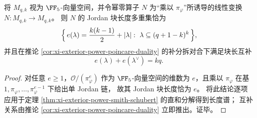 \begin{corollary}\label{cor:xi-exterior-power-jordan-schubert}
将 \(M_{q,k}\) 视为 \(\FF_5\)-向量空间，并令幂零算子 \(N\) 为“乘以 \(\pi_\varphi\)”所诱导的线性变换
\(
N:M_{q,k}\to M_{q,k}
\)。
则 \(N\) 的 Jordan 块长度多重集恰为
\[
\Bigl\{\,e(\lambda)=\frac{k(k-1)}{2}+|\lambda|:\ \lambda\subseteq (q+1-k)^k\,\Bigr\},
\]
并且在推论 \ref{cor:xi-exterior-power-poincare-duality} 的补分拆对合下满足块长互补
\[
e(\lambda)+e(\lambda^\vee)=kq.
\]
\end{corollary}
\begin{proof}
对任意 \(e\ge 1\)，\(\mathcal O/(\pi_\varphi^{e})\) 作为 \(\FF_5\)-向量空间的维数为 \(e\)，且乘以 \(\pi_\varphi\) 在基 \(1,\pi_\varphi,\dots,\pi_\varphi^{e-1}\) 下给出单 Jordan 链，
故其 Jordan 块长度恰为 \(e\)。
将此结论逐项应用于定理 \ref{thm:xi-exterior-power-smith-schubert} 的直和分解得到长度谱；
互补关系由推论 \ref{cor:xi-exterior-power-poincare-duality} 立即推出。证毕。
\end{proof}

